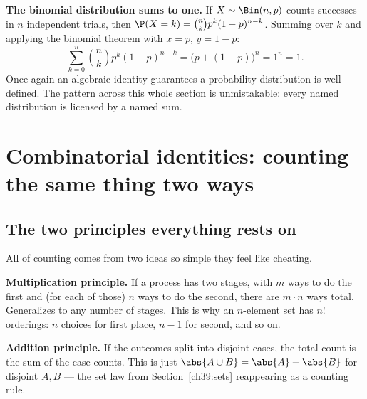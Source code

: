 \begin{applicationbox}
\textbf{The binomial distribution sums to one.} If $X \sim \Bin(n,p)$ counts
successes in $n$ independent trials, then $\P(X=k) = \binom{n}{k}p^k(1-p)^{n-k}$.
Summing over $k$ and applying the binomial theorem with $x=p$, $y=1-p$:
\[
  \sum_{k=0}^{n}\binom{n}{k}p^{k}(1-p)^{n-k} = \big(p + (1-p)\big)^{n}
  = 1^{n} = 1.
\]
Once again an algebraic identity guarantees a probability distribution is
well-defined. The pattern across this whole section is unmistakable: every
named distribution is licensed by a named sum.
\end{applicationbox}

\section{Combinatorial identities: counting the same thing two ways}
\label{ch39:counting}

\subsection{The two principles everything rests on}

All of counting comes from two ideas so simple they feel like cheating.

\textbf{Multiplication principle.} If a process has two stages, with $m$ ways
to do the first and (for each of those) $n$ ways to do the second, there are
$m \cdot n$ ways total. Generalizes to any number of stages. This is why an
$n$-element set has $n!$ orderings: $n$ choices for first place, $n-1$ for
second, and so on.

\textbf{Addition principle.} If the outcomes split into disjoint cases, the
total count is the sum of the case counts. This is just $\abs{A \cup B} =
\abs{A} + \abs{B}$ for disjoint $A, B$ --- the set law from
Section~\ref{ch39:sets} reappearing as a counting rule.


